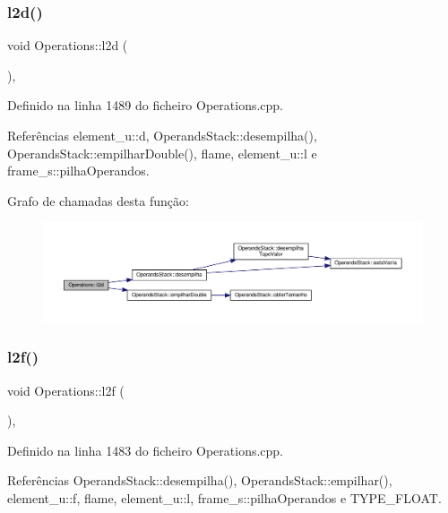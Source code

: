 \subsubsection{\texorpdfstring{l2d()}{l2d()}}
{\footnotesize\ttfamily void Operations\+::l2d (\begin{DoxyParamCaption}{ }\end{DoxyParamCaption})\hspace{0.3cm}{\ttfamily [static]}, {\ttfamily [private]}}



Definido na linha 1489 do ficheiro Operations.\+cpp.



Referências element\+\_\+u\+::d, Operands\+Stack\+::desempilha(), Operands\+Stack\+::empilhar\+Double(), flame, element\+\_\+u\+::l e frame\+\_\+s\+::pilha\+Operandos.

Grafo de chamadas desta função\+:
\nopagebreak
\begin{figure}[H]
\begin{center}
\leavevmode
\includegraphics[width=350pt]{classOperations_aab1532a2f22ab943a1ec37e33ae742b3_cgraph}
\end{center}
\end{figure}
\mbox{\label{classOperations_af2064cce9ba6f6a4be257354f21f537e}} 
\subsubsection{\texorpdfstring{l2f()}{l2f()}}
{\footnotesize\ttfamily void Operations\+::l2f (\begin{DoxyParamCaption}{ }\end{DoxyParamCaption})\hspace{0.3cm}{\ttfamily [static]}, {\ttfamily [private]}}



Definido na linha 1483 do ficheiro Operations.\+cpp.



Referências Operands\+Stack\+::desempilha(), Operands\+Stack\+::empilhar(), element\+\_\+u\+::f, flame, element\+\_\+u\+::l, frame\+\_\+s\+::pilha\+Operandos e T\+Y\+P\+E\+\_\+\+F\+L\+O\+AT.

